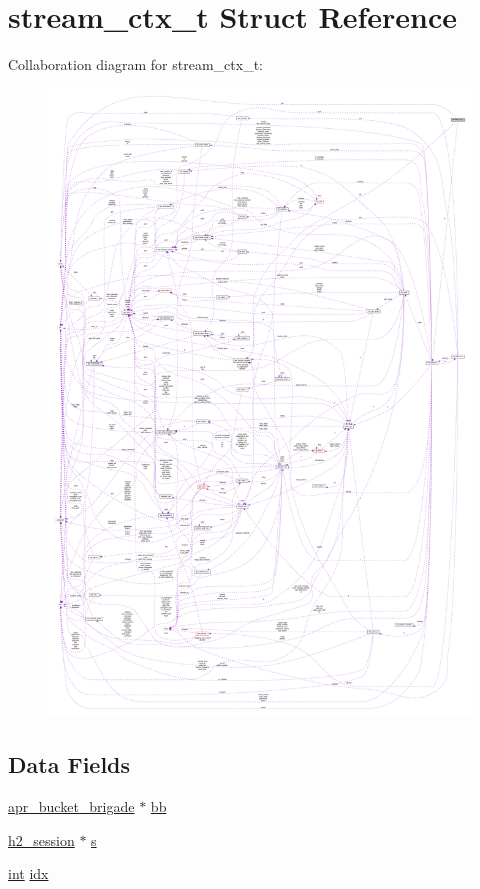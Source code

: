 \hypertarget{structstream__ctx__t}{}\section{stream\+\_\+ctx\+\_\+t Struct Reference}
\label{structstream__ctx__t}


Collaboration diagram for stream\+\_\+ctx\+\_\+t\+:
\nopagebreak
\begin{figure}[H]
\begin{center}
\leavevmode
\includegraphics[width=350pt]{structstream__ctx__t__coll__graph}
\end{center}
\end{figure}
\subsection*{Data Fields}
\begin{DoxyCompactItemize}
\item 
\hyperlink{structapr__bucket__brigade}{apr\+\_\+bucket\+\_\+brigade} $\ast$ \hyperlink{structstream__ctx__t_a5813a0c8e9aada26dd87deb749fec2e8}{bb}
\item 
\hyperlink{structh2__session}{h2\+\_\+session} $\ast$ \hyperlink{structstream__ctx__t_a70d283402cc0db693505ea1fcab4ee78}{s}
\item 
\hyperlink{pcre_8txt_a42dfa4ff673c82d8efe7144098fbc198}{int} \hyperlink{structstream__ctx__t_a3c189b2f82c8ace9f9b0b73e0fe0b1a2}{idx}
\end{DoxyCompactItemize}


